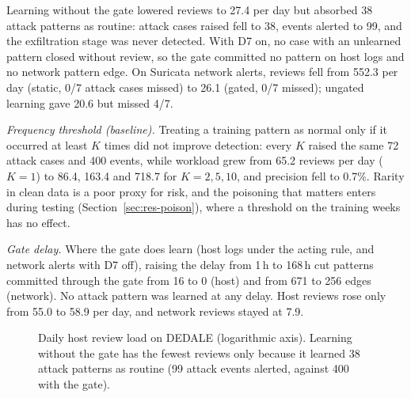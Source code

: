 \documentclass[conference]{IEEEtran}
\begin{document}
Learning without the gate lowered reviews to 27.4 per day but absorbed 38 attack patterns as routine: attack cases
raised fell to 38, events alerted to 99, and the exfiltration stage was never detected. With D7 on, no case with an
unlearned pattern closed without review, so the gate committed no pattern on host logs and no network pattern edge.
On Suricata network alerts, reviews fell from 552.3 per day (static, 0/7 attack cases missed) to 26.1 (gated, 0/7
missed); ungated learning gave 20.6 but missed 4/7.

\emph{Frequency threshold (baseline).} Treating a training pattern as normal only if it occurred at least $K$ times
did not improve detection: every $K$ raised the same 72 attack cases and 400 events, while workload grew from 65.2
reviews per day ($K{=}1$) to 86.4, 163.4 and 718.7 for $K = 2, 5, 10$, and precision fell to 0.7\%. Rarity in clean
data is a poor proxy for risk, and the poisoning that matters enters during testing (Section~\ref{sec:res-poison}),
where a threshold on the training weeks has no effect.

\emph{Gate delay.} Where the gate does learn (host logs under the acting rule, and network alerts with D7 off),
raising the delay from 1\,h to 168\,h cut patterns committed through the gate from 16 to 0 (host) and from 671 to
256 edges (network). No attack pattern was learned at any delay. Host reviews rose only from 55.0 to 58.9 per day,
and network reviews stayed at 7.9.

\begin{figure}[t]
\centering
{}
\caption{Daily host review load on DEDALE (logarithmic axis). Learning without the gate has the fewest reviews only because it
learned 38 attack patterns as routine (99 attack events alerted, against 400 with the gate).}
\label{fig:c2}
\end{figure}
\end{document}
